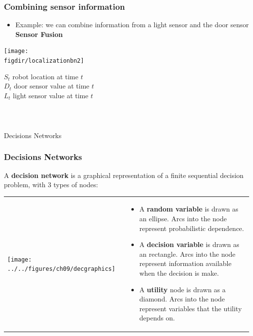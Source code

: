 \documentclass[12pt]{beamer} %
\newcommand{\figdir}{../../figures/ch06}
\begin{document}
\begin{frame}
\frametitle{Combining sensor information}
\begin{itemize}
\item Example: we can combine information from a light sensor and the
  door sensor \textbf{Sensor Fusion}
\end{itemize}
\begin{center}
\texttt{[image: \\figdir/localizationbn2]}
\end{center}
$S_t$ robot location at time $t$\\
$D_t$ door sensor value at time $t$\\
$L_t$ light sensor value at time $t$

\end{frame}





\begin{frame}
\frametitle{~}
Decisions Networks
\end{frame}




\begin{frame}
\frametitle{Decisions Networks}
A \textbf{decision network} is a graphical representation of
a finite sequential decision problem, with 3 types of nodes:
\begin{center}
\begin{tabular}{ll}
\texttt{[image: ../../figures/ch09/decgraphics]} &
\begin{minipage}[b]{0.65\textwidth}
\begin{itemize}
\item A \textbf{random variable} is drawn as an ellipse. Arcs into the node
represent probabilistic dependence.
\item A \textbf{decision variable} is drawn as an rectangle. Arcs
into the node represent information available when the decision is
make.
\item A \textbf{utility} node is drawn as a  diamond. Arcs into the
node represent variables that the utility depends on.
\end{itemize}

\end{minipage}

\end{tabular}
\end{center}

\end{frame}
\end{document}

